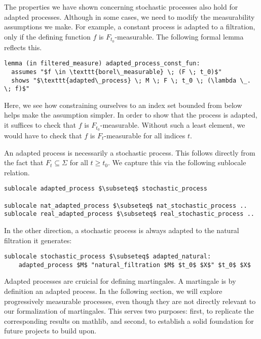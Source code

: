 The properties we have shown concerning stochastic processes also hold for adapted processes. Although in some cases, we need to modify the measurability assumptions we make. For example, a constant process is adapted to a filtration, only if the defining function $f$ is $F_{t_0}$-measurable. The following formal lemma reflects this.
\begin{isalemma}
{\small
\begin{lstlisting}[style=isabelle]
lemma (in filtered_measure) adapted_process_const_fun:
  assumes "$f \in \texttt{borel\_measurable} \; (F \; t_0)$"
  shows "$\texttt{adapted\_process} \; M \; F \; t_0 \; (\lambda \_. \; f)$"
\end{lstlisting}
}
\end{isalemma}
\begin{remark}
Here, we see how constraining ourselves to an index set bounded from below helps make the assumption simpler. In order to show that the process is adapted, it suffices to check that $f$ is $F_{t_0}$-measurable. Without such a least element, we would have to check that $f$ is $F_t$-measurable for all indices $t$.
\end{remark}
An adapted process is necessarily a stochastic process. This follows directly from the fact that $F_t \subseteq \Sigma$ for all $t \ge t_0$. We capture this via the following sublocale relation.

\begin{isalemma}
{\small
\begin{lstlisting}[style=isabelle]
sublocale adapted_process $\subseteq$ stochastic_process 

sublocale nat_adapted_process $\subseteq$ nat_stochastic_process ..
sublocale real_adapted_process $\subseteq$ real_stochastic_process ..
\end{lstlisting}
}
\end{isalemma}


In the other direction, a stochastic process is always adapted to the natural filtration it generates:

\begin{isalemma}
{\small
\begin{lstlisting}[style=isabelle]
sublocale stochastic_process $\subseteq$ adapted_natural: 
	adapted_process $M$ "natural_filtration $M$ $t_0$ $X$" $t_0$ $X$ 
\end{lstlisting}
}
\end{isalemma}

Adapted processes are cruicial for defining martingales. A martingale is by definition an adapted process. In the following section, we will explore progressively measurable processes, even though they are not directly relevant to our formalization of martingales. This serves two purposes: first, to replicate the corresponding results on \textsf{mathlib}, and second, to establish a solid foundation for future projects to build upon.

